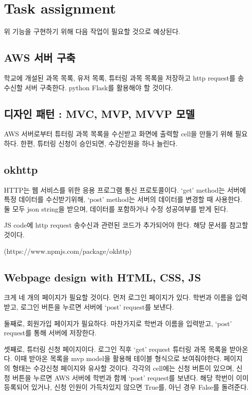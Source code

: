 \documentclass{lxaiproposal}
\begin{document}
\section{Task assignment}
\vspace*{-3mm}

위 기능을 구현하기 위해 다음 작업이 필요할 것으로 예상된다.
\subsection{AWS 서버 구축}
학교에 개설된 과목 목록, 유저 목록, 튜터링 과목 목록을 저장하고 http request를 송수신할 서버 구축한다. python Flask를 활용해야 할 것이다.

\subsection{디자인 패턴 : MVC, MVP, MVVP 모델}
AWS 서버로부터 튜터링 과목 목록을 수신받고 화면에 출력할 cell을 만들기 위해 필요하다. 한편, 튜터링 신청이 승인되면, 수강인원을 하나 늘린다.

\subsection{okhttp}
HTTP는 웹 서비스를 위한 응용 프로그램 통신 프로토콜이다.
`get' method는 서버에 특정 데이터를 수신받기위해, `post' method는 서버의 데이터를 변경할 때 사용한다. 
둘 모두 json string을 받으며, 데이터를 포함하거나 수정 성공여부를 받게 된다. 

JS code에 http request 송수신과 관련된 코드가 추가되어야 한다. 해당 문서를 참고할 것이다.

(https://www.npmjs.com/package/okhttp)

\subsection{Webpage design with HTML, CSS, JS}
크게 네 개의 페이지가 필요할 것이다. 
먼저 로그인 페이지가 있다. 학번과 이름을 입력받고, 로그인 버튼을 누르면 서버에 `post' request를 보낸다.

둘째로, 회원가입 페이지가 필요하다. 마찬가지로 학번과 이름을 입력받고, `post' request를 통해 서버에 저장한다.

셋째로, 튜터링 신청 페이지이다. 로그인 직후 `get' request 튜터링 과목 목록을 받아온다. 이때 받아온 목록을 mvp model을 활용해 테이블 형식으로 보여줘야한다. 
페이지의 형태는 수강신청 페이지와 유사할 것이다.
각각의 cell에는 신청 버튼이 있으며, 신청 버튼을 누르면 AWS 서버에 학번과 함께 `post' request를 보낸다. 
해당 학번이 이미 등록되어 있거나, 신청 인원이 가득차있지 않으면 True를, 아닌 경우 False를 돌려준다.
\end{document}
